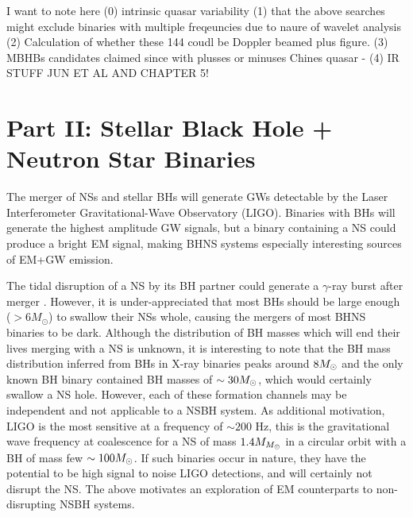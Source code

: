 I want to note here 
(0) intrinsic quasar variability
(1) that the above searches might exclude binaries with multiple freqeuncies due to naure of wavelet analysis
(2) Calculation of whether these 144 coudl be Doppler beamed plus figure.
(3) MBHBs candidates claimed since with plusses or minuses
	Chines quasar - 
(4) IR STUFF JUN ET AL AND CHAPTER 5!






\section{Part II: Stellar Black Hole + Neutron Star Binaries}
%

The merger of NSs and stellar BHs will generate GWs detectable by the Laser
Interferometer Gravitational-Wave Observatory (LIGO). Binaries with BHs will
generate the highest amplitude GW signals, but a binary containing a NS could
produce a bright EM signal, making BHNS systems especially interesting sources
of EM+GW emission.

The tidal disruption of a NS by its BH partner could generate a $\gamma$-ray
burst after merger \citep{NPP:NSBH_GRB:1992}. However, it is under-appreciated
that most BHs should be large enough ($> 6M_\odot $) to swallow their NSs
whole, causing the mergers of most BHNS binaries to be dark. 
Although the distribution of BH masses
which will end their lives merging with a NS is unknown, it is interesting to
note that the BH mass distribution inferred from BHs in X-ray binaries peaks
around $8 {M_{\odot}}$ \citep{Orzel:2008} and the only known BH binary contained BH
masses of $\sim 30 {M_{\odot}}$, which would certainly swallow a NS hole. However,
each of these formation channels may be independent and not applicable to a
NSBH system. As additional motivation, LIGO is the most sensitive at a
frequency of $\sim 200$ Hz, this is the gravitational wave frequency at
coalescence for a NS of mass $1.4 M_{{M_{\odot}}}$ in a circular orbit with a BH of
mass few $\sim100 {M_{\odot}}$. If such binaries occur in nature, they have the
potential to be high signal to noise LIGO detections, and will certainly not
disrupt the NS. The above motivates an exploration of EM counterparts to non-
disrupting NSBH systems.





